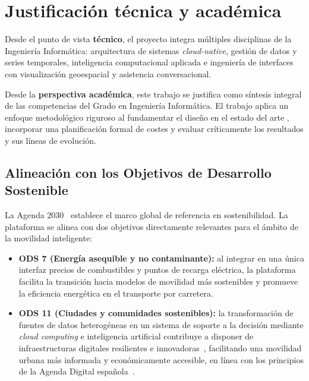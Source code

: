 \section{Justificación técnica y académica}

Desde el punto de vista \textbf{técnico}, el proyecto integra múltiples disciplinas de
la Ingeniería Informática: arquitectura de sistemas \textit{cloud-native}, gestión de
datos y series temporales, inteligencia computacional aplicada \cite{LAHMIRI2024105008}
e ingeniería de interfaces con visualización geoespacial y asistencia conversacional.

Desde la \textbf{perspectiva académica}, este trabajo se justifica como síntesis integral
de las competencias del Grado en Ingeniería Informática. El trabajo aplica un enfoque metodológico riguroso al fundamentar el diseño en el 
estado del arte \cite{Gartner2026Trends}, incorporar una planificación formal de costes y evaluar críticamente los resultados y sus líneas de evolución.

\subsection{Alineación con los Objetivos de Desarrollo Sostenible}

La Agenda 2030~\cite{onu_ods_goals} establece el marco global de referencia en
sostenibilidad. La plataforma se alinea con dos objetivos directamente relevantes
para el ámbito de la movilidad inteligente:

\begin{itemize}
  \item \textbf{ODS 7 (Energía asequible y no contaminante):} al integrar en una
        única interfaz precios de combustibles y puntos de recarga eléctrica, la
        plataforma facilita la transición hacia modelos de movilidad más sostenibles
        y promueve la eficiencia energética en el transporte por carretera.
  \item \textbf{ODS 11 (Ciudades y comunidades sostenibles):} la transformación de
        fuentes de datos heterogéneas en un sistema de soporte a la decisión mediante
        \textit{cloud computing} e inteligencia artificial contribuye a disponer de
        infraestructuras digitales resilientes e innovadoras~\cite{mitma_esmovilidad},
        facilitando una movilidad urbana más informada y económicamente accesible,
        en línea con los principios de la Agenda Digital española~\cite{gob_agenda2030_espana}.
\end{itemize}